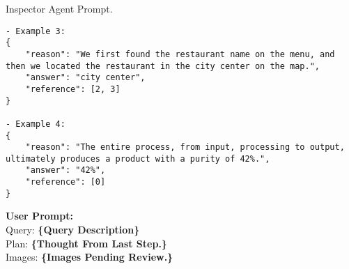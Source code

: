\begin{figure*}[!ht]
\begin{AIbox}{Inspector Agent Prompt.}
\begin{lstlisting}[style=prompt]
- Example 3:
{
    "reason": "We first found the restaurant name on the menu, and then we located the restaurant in the city center on the map.",
    "answer": "city center",
    "reference": [2, 3]
}

- Example 4:
{
    "reason": "The entire process, from input, processing to output, ultimately produces a product with a purity of 42%.",
    "answer": "42%",
    "reference": [0]
}
\end{lstlisting}


\tcblower
{\color{black}\bf \large User Prompt:}\\
Query: {\color{deepblue}\bf \{Query Description\}} \\
Plan: {\color{deepblue}\bf \{Thought From Last Step.\}} \\
Images: {\color{deepblue}\bf \{Images Pending Review.\}} 

\end{AIbox}
\vspace{-1em}
\caption{Prompt of Inspector Agent.}
\label{fig: inspector}
\end{figure*}
